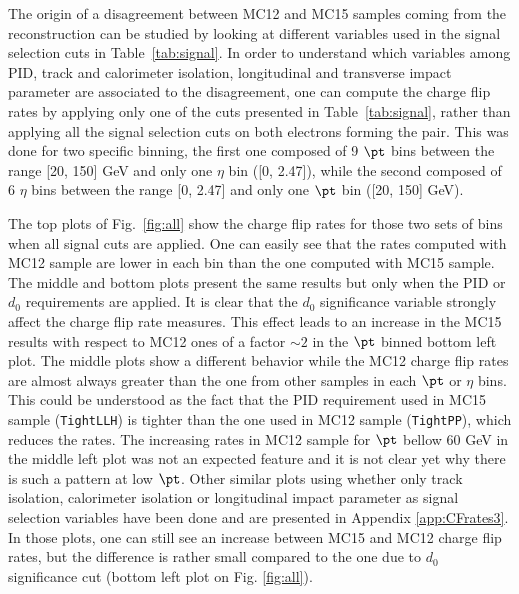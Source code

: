 The origin of a disagreement between MC12 and MC15 samples coming from the reconstruction can be studied by looking at different variables used in the signal selection cuts in Table~\ref{tab:signal}. In order to understand which variables among PID, track and calorimeter isolation, longitudinal and transverse impact parameter are associated to the disagreement, one can compute the charge flip rates by applying only one of the cuts presented in Table~\ref{tab:signal}, rather than applying all the signal selection cuts on both electrons forming the pair. This was done for two specific binning, the first one composed of 9 $\pt$ bins between the range [20, 150] GeV and only one $\eta$ bin ([0, 2.47]), while the second composed of 6 $\eta$ bins between the range [0, 2.47] and only one $\pt$ bin ([20, 150] GeV). 

The top plots of Fig.~\ref{fig:all} show the charge flip rates for those two sets of bins when all signal cuts are applied. One can easily see that the rates computed with MC12 sample are lower in each bin than the one computed with MC15 sample. The middle and bottom plots present the same results but only when the PID or $d_0$ requirements are applied. It is clear that the $d_0$ significance variable strongly affect the charge flip rate measures. This effect leads to an increase in the MC15 results with respect to MC12 ones of a factor $\sim 2$ in the $\pt$ binned bottom left plot. The middle plots show a different behavior while the MC12 charge flip rates are almost always greater than the one from other samples in each $\pt$ or $\eta$ bins. This could be understood as the fact that the PID requirement used in MC15 sample (\texttt{TightLLH}) is tighter than the one used in MC12 sample (\texttt{TightPP}), which reduces the rates. The increasing rates in MC12 sample for $\pt$ bellow 60 GeV in the middle left plot was not an expected feature and it is not clear yet why there is such a pattern at low $\pt$. Other similar plots using whether only track isolation, calorimeter isolation or longitudinal impact parameter as signal selection variables have been done and are presented in Appendix \ref{app:CFrates3}. In those plots, one can still see an increase between MC15 and MC12 charge flip rates, but the difference is rather small compared to the one due to $d_0$ significance cut (bottom left plot on Fig. \ref{fig:all}).

